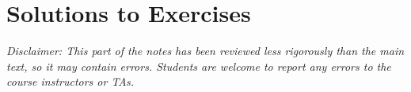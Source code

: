 \ifdefined\reviewinlinesolutions\else
\chapter{Solutions to Exercises}
\label{ch:solutions}

\emph{Disclaimer: This part of the notes has been reviewed less rigorously than the main text, so it may contain errors. Students are welcome to report any errors to the course instructors or TAs.}

\printallsolutions
\fi
